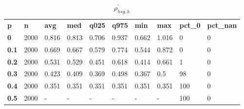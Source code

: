 \begin{table}[h]
 \centering 
\footnotesize
\caption{$\rho_{hsg,h}^\prime $}
\label{tab:alphahsgh}
\begin{tabular}[h]{| l l l l l l l l l l|
    } \hline
\textbf{ p} & \textbf{ n} & \textbf{ avg} & \textbf{ med} & \textbf{ q025} & \textbf{ q975} & \textbf{ min} & \textbf{ max} & \textbf{ pct\_0} & \textbf{ pct\_nan}
           \\
  \textbf{  0} & 2000 & 0.816 & 0.813 & 0.706 & 0.937 & 0.662 & 1.016 &   0 & 0
           \\
  \textbf{0.1} & 2000 & 0.669 & 0.667 & 0.579 & 0.774 & 0.544 & 0.872 &   0 & 0
           \\
  \textbf{0.2} & 2000 & 0.531 & 0.529 & 0.451 & 0.618 & 0.414 & 0.661 &   1 & 0
           \\
  \textbf{0.3} & 2000 & 0.423 & 0.409 & 0.369 & 0.498 & 0.367 &   0.5 &  98 & 0
           \\
  \textbf{0.4} & 2000 & 0.351 & 0.351 & 0.351 & 0.351 & 0.351 & 0.351 & 100 & 0
           \\
  \textbf{0.5} & 2000 & - & - & - & - & - & - & 100 & 0
           \\
 \hline \end{tabular}
 \end{table}
